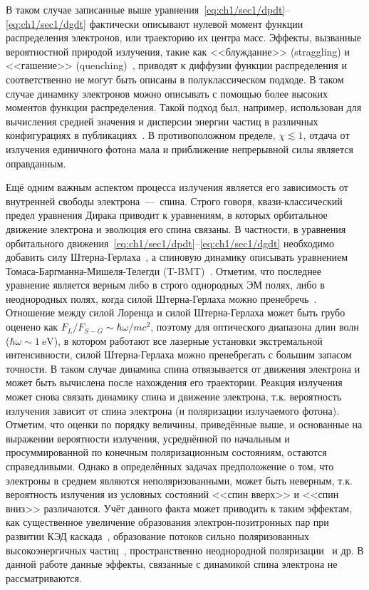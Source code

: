 В таком случае записанные выше уравнения~\eqref{eq:ch1/sec1/dpdt}--\eqref{eq:ch1/sec1/dgdt} фактически описывают нулевой момент функции распределения электронов, или траекторию их центра масс.
Эффекты, вызванные вероятностной природой излучения, такие как <<блуждание>> (straggling) и <<гашение>> (quenching)~\cite{shen1972energy, duclous2010monte, harvey2017quantum, gonoskov2021charged}, приводят к диффузии функции распределения и соответственно не могут быть описаны в полуклассическом подходе.
В таком случае динамику электронов можно описывать с помощью более высоких моментов функции распределения.
Такой подход был, например, использован для вычисления средней значения и дисперсии энергии частиц в различных конфигурациях в публикациях~\cite{neitz2013stochasticity, ridgers2017signatures, niel2018quantum}.
В противоположном пределе, $\chi \lesssim 1$, отдача от излучения единичного фотона мала и приближение непрерывной силы является оправданным.

Ещё одним важным аспектом процесса излучения является его зависимость от внутренней свободы электрона~---~спина.
Строго говоря, квази-классический предел уравнения Дирака приводит к уравнениям, в которых орбитальное движение электрона и эволюция его спина связаны.
В частности, в уравнения орбитального движения~\eqref{eq:ch1/sec1/dpdt}--\eqref{eq:ch1/sec1/dgdt} необходимо добавить силу Штерна-Герлаха~\cite{gerlach1922experimentelle}, а спиновую динамику описывать уравнением Томаса-Баргманна-Мишеля-Телегди (T-BMT)~\cite{thomas1926motion, bargmann1959precession}.
Отметим, что последнее уравнение является верным либо в строго однородных ЭМ полях, либо в неоднородных полях, когда силой Штерна-Герлаха можно пренебречь~\cite{mane2005spin}.
Отношение между силой Лоренца и силой Штерна-Герлаха может быть грубо оценено как $F_L/F_{S-G}\!\!\sim\!\!\hbar\omega/mc^2$, поэтому для оптического диапазона длин волн ($\hbar\omega\!\!\!\sim\!\!\!\SI{1}{\electronvolt}$), в котором работают все лазерные установки экстремальной интенсивности, силой Штерна-Герлаха можно пренебрегать с большим запасом точности.
В таком случае динамика спина отвязывается от движения электрона и может быть вычислена после нахождения его траектории.
Реакция излучения может снова связать динамику спина и движение электрона, т.к. вероятность излучения зависит от спина электрона (и поляризации излучаемого фотона).
Отметим, что оценки по порядку величины, приведённые выше, и основанные на выражении вероятности излучения, усреднённой по начальным и просуммированной по конечным поляризационным состояниям, остаются справедливыми.
Однако в определённых задачах предположение о том, что электроны в среднем являются неполяризованными, может быть неверным, т.к. вероятность излучения из условных состояний <<спин вверх>> и <<спин вниз>> различаются.
Учёт данного факта может приводить к таким эффектам, как существенное увеличение образования электрон-позитронных пар при развитии КЭД каскада~\cite{Seipt2021PolarizedQEDcascad}, образование потоков сильно поляризованных высокоэнергичных частиц~\cite{wen2019polarized, li2019ultrarelativistic}, пространственно неоднородной поляризации~\cite{gong2021retrieving} и др.
В данной работе данные эффекты, связанные с динамикой спина электрона не рассматриваются.

